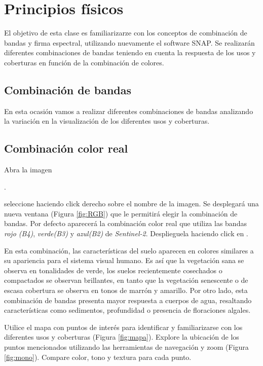 \chapter{Principios físicos}

El objetivo de esta clase es familiarizarze con los conceptos de combinación de bandas y firma espectral, utilizando nuevamente el software SNAP. Se realizarán diferentes combinaciones de bandas teniendo en cuenta la respuesta de los usos y coberturas en función de la combinación de colores. 





\section{Combinación de bandas}
En esta ocasión vamos a realizar diferentes combinaciones de bandas analizando la variación en la visualización de los diferentes usos y coberturas.


\section{Combinación color real}\label{sec:colorreal}

Abra la imagen \begin{center} .
\end{center} seleccione  haciendo click derecho sobre el nombre de la imagen. Se desplegará una nueva ventana (Figura \ref{fig:RGB}) que le permitirá elegir la combinación de bandas. Por defecto aparecerá la combinación color real que utiliza las bandas \emph{rojo (B4)}, \emph{verde(B3)} y \emph{azul(B2)} de \emph{Sentinel-2}. Desplieguela haciendo click en .

En esta combinación, las características del suelo aparecen en colores similares a su apariencia para el sistema visual humano. Es así que la vegetación sana se observa en tonalidades de verde, los suelos recientemente cosechados o compactados se observan brillantes, en tanto que la vegetación senescente o de escasa cobertura se observa en tonos de marrón y amarillo. Por otro lado, esta combinación de bandas presenta mayor respuesta a cuerpos de agua, resaltando características como sedimentos, profundidad o presencia de floraciones algales.

Utilice el mapa con puntos de interés para identificar y familiarizarse con los diferentes usos y coberturas (Figura \ref{fig:mapa}). Explore la ubicación de los puntos mencionados utilizando las herramientas de navegación y zoom  (Figura \ref{fig:mono}). Compare color, tono y textura para cada punto.



